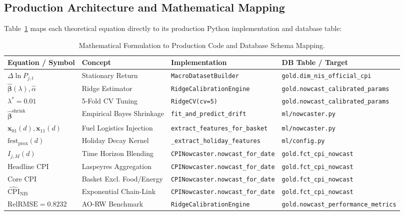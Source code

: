 \documentclass[a4paper, 11pt]{article}
\begin{document}
\subsection{Production Architecture and Mathematical Mapping}
Table~\ref{tab:code_mapping} maps each theoretical equation directly to its production Python implementation and database table:

\begin{table}[H]
\centering
\footnotesize
\begin{tabularx}{\textwidth}{@{}llXX@{}}
\toprule
\textbf{Equation / Symbol} & \textbf{Concept} & \textbf{Implementation} & \textbf{DB Table / Target} \\ \midrule
$\Delta \ln P_{j, t}$ & Stationary Return & \texttt{MacroDatasetBuilder} & \texttt{gold.dim\_nis\_official\_cpi} \\
$\hat{\boldsymbol{\beta}}(\lambda), \hat{\alpha}$ & Ridge Estimator & \texttt{RidgeCalibrationEngine} & \texttt{gold.nowcast\_calibrated\_params} \\
$\lambda^* = 0.01$ & 5-Fold CV Tuning & \texttt{RidgeCV(cv=5)} & \texttt{gold.nowcast\_calibrated\_params} \\
$\hat{\boldsymbol{\beta}}^{\text{shrink}}$ & Empirical Bayes Shrinkage & \texttt{fit\_and\_predict\_drift} & \texttt{ml/nowcaster.py} \\
$\mathbf{x}_{01}(d), \mathbf{x}_{11}(d)$ & Fuel Logistics Injection & \texttt{extract\_features\_for\_basket} & \texttt{ml/nowcaster.py} \\
$\text{fest}_{\text{prox}}(d)$ & Holiday Decay Kernel & \texttt{\_extract\_holiday\_features} & \texttt{ml/config.py} \\
$I_{j, M}(d)$ & Time Horizon Blending & \texttt{CPINowcaster.nowcast\_for\_date} & \texttt{gold.fct\_cpi\_nowcast} \\
$\text{Headline CPI}$ & Laspeyres Aggregation & \texttt{CPINowcaster.nowcast\_for\_date} & \texttt{gold.fct\_cpi\_nowcast} \\
$\text{Core CPI}$ & Basket Excl. Food/Energy & \texttt{CPINowcaster.nowcast\_for\_date} & \texttt{gold.fct\_cpi\_nowcast} \\
$\widehat{\text{CPI}}_{\text{NIS}}$ & Exponential Chain-Link & \texttt{CPINowcaster.nowcast\_for\_date} & \texttt{gold.fct\_cpi\_nowcast} \\
$\text{RelRMSE} = 0.8232$ & AO-RW Benchmark & \texttt{RidgeCalibrationEngine} & \texttt{gold.nowcast\_performance\_metrics} \\ \bottomrule
\end{tabularx}
\caption{Mathematical Formulation to Production Code and Database Schema Mapping.}
\label{tab:code_mapping}
\end{table}
\end{document}
